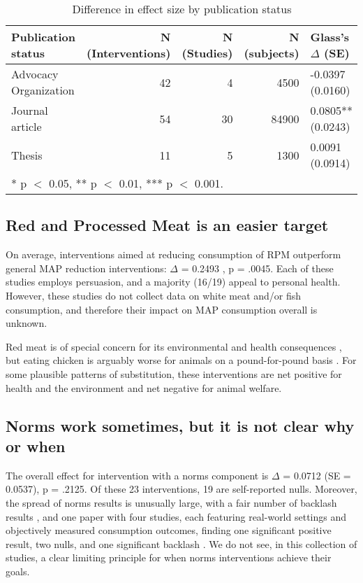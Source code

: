 \documentclass[sn-nature,pdflatex]{sn-jnl}
\begin{document}
\begin{table}[!h]
\centering
\caption{\label{tab:tab:table_three}Difference in effect size by publication status}
\centering
\begin{tabular}[t]{lrrrl}
\toprule
Publication status & N (Interventions) & N (Studies) & N (subjects) & Glass's $\Delta$ (SE)\\
\midrule
Advocacy Organization & 42 & 4 & 4500 & -0.0397 (0.0160)\\
Journal article & 54 & 30 & 84900 & 0.0805** (0.0243)\\
Thesis & 11 & 5 & 1300 & 0.0091 (0.0914)\\
\bottomrule
\multicolumn{5}{l}{\rule{0pt}{1em}* p $<$ 0.05, ** p $<$ 0.01, *** p $<$ 0.001.}\\
\end{tabular}
\end{table}

\subsection{Red and Processed Meat is an easier target}\label{sec2.4}

On average, interventions aimed at reducing consumption of RPM
outperform general MAP reduction interventions: \(\Delta\) = 0.2493
, p = .0045. Each of these studies employs
persuasion, and a majority (16/19) appeal to personal health. However,
these studies do not collect data on white meat and/or fish consumption,
and therefore their impact on MAP consumption overall is unknown.

Red meat is of special concern for its environmental and health
consequences \citep{grummon2023}, but eating chicken is arguably worse
for animals on a pound-for-pound basis \citep{mathur2022ethical}. For
some plausible patterns of substitution, these interventions are net
positive for health and the environment and net negative for animal
welfare.

\subsection{Norms work sometimes, but it is not clear why or
when}\label{sec2.5}

The overall effect for intervention with a norms component is \(\Delta\)
= 0.0712 (SE = 0.0537), p = .2125. Of these 23 interventions, 19 are
self-reported nulls. Moreover, the spread of norms results is unusually
large, with a fair number of backlash results
\citep{mattson2020, griesoph2021}, and one paper with four studies, each
featuring real-world settings and objectively measured consumption
outcomes, finding one significant positive result, two nulls, and one
significant backlash \citep{sparkman2020}. We do not see, in this
collection of studies, a clear limiting principle for when norms
interventions achieve their goals.
\end{document}
